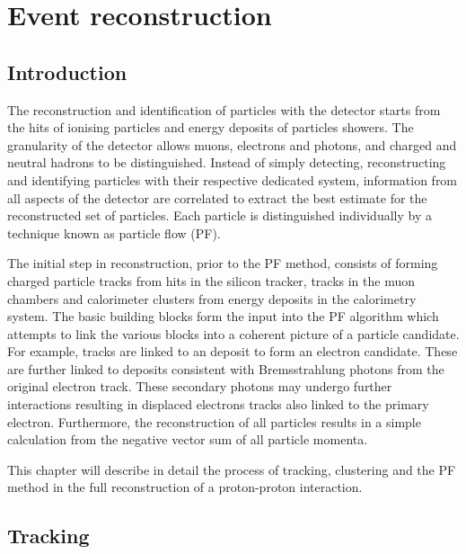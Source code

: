 \chapter{Event reconstruction}\label{chap:reconstruction}


\section{Introduction}

The reconstruction and identification of particles with the \CMS detector starts from the hits of ionising particles and energy deposits of particles showers. The granularity of the \CMS detector allows muons, electrons and photons, and charged and neutral hadrons to be distinguished. Instead of simply detecting, reconstructing and identifying particles with their respective dedicated system, information from all aspects of the detector are correlated to extract the best estimate for the reconstructed set of particles. Each particle is distinguished individually by a technique known as particle flow (PF).

The initial step in reconstruction, prior to the PF method, consists of forming charged particle tracks from hits in the silicon tracker, tracks in the muon chambers and calorimeter clusters from energy deposits in the calorimetry system. The basic building blocks form the input into the PF algorithm which attempts to link the various blocks into a coherent picture of a particle candidate. For example, tracks are linked to an \ECAL deposit to form an electron candidate. These are further linked to \ECAL deposits consistent with Bremsstrahlung photons from the original electron track. These secondary photons may undergo further interactions resulting in displaced electrons tracks also linked to the primary electron. Furthermore, the reconstruction of all particles results in a simple \ptmiss calculation from the negative vector sum of all particle momenta.

This chapter will describe in detail the process of tracking, clustering and the PF method in the full reconstruction of a proton-proton interaction.


\section{Tracking}

